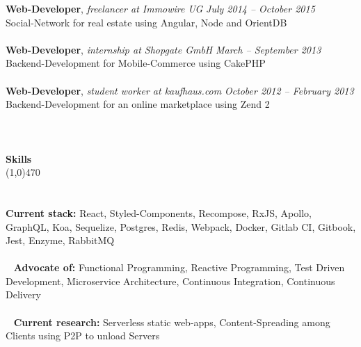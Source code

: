 \documentclass[10pt]{article} %
\begin{document}
{\bf Web-Developer}, \textit{freelancer at Immowire UG}  \hfill \textit{ July 2014 -- October 2015 } \\ 
Social-Network for real estate using Angular, Node and OrientDB\\\\
\noindent
{\bf Web-Developer}, \textit{internship at Shopgate GmbH}  \hfill \textit{ March -- September 2013 } \\ 
Backend-Development for Mobile-Commerce using CakePHP\\\\
\noindent
{\bf Web-Developer}, \textit{student worker at kaufhaus.com}  \hfill \textit{ October 2012 -- February 2013 } \\ 
Backend-Development for an online marketplace using Zend 2\\\\
\noindent
\\\\
{\Large \bf Skills}\\
\line(1,0){470}\\
\\\\
\noindent
{\bf Current stack:} React, Styled-Components, Recompose, RxJS, Apollo, GraphQL, Koa, Sequelize, Postgres, Redis, Webpack, Docker, Gitlab CI, Gitbook, Jest, Enzyme, RabbitMQ \\\\\
\noindent
{\bf Advocate of:} Functional Programming, Reactive Programming, Test Driven Development, Microservice Architecture, Continuous Integration, Continuous Delivery \\\\\
\noindent
{\bf Current research:} Serverless static web-apps, Content-Spreading among Clients using P2P to unload Servers \\\\\
\end{document}
